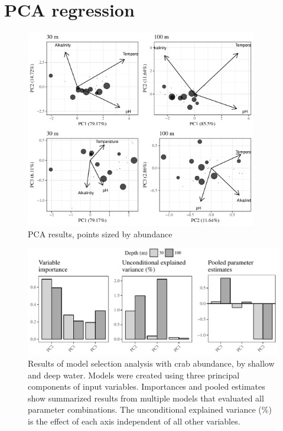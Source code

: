 \documentclass[letterpaper,12pt]{article}\usepackage[]{graphicx}\usepackage[]{color}
\makeatletter
\def\maxwidth{ %
  \ifdim\Gin@nat@width>\linewidth
    \linewidth
  \else
    \Gin@nat@width
  \fi
}
\newenvironment{knitrout}{}{} %
\makeatother
\begin{document}
\section{PCA regression}

\begin{knitrout}
\color{fgcolor}\begin{figure}[!h]
\includegraphics[width=0.9\textwidth]{figure/unnamed-chunk-8-1} \caption[PCA results, points sized by abundance]{PCA results, points sized by abundance}\label{fig:unnamed-chunk-8}
\end{figure}


\end{knitrout}



\begin{knitrout}
\color{fgcolor}\begin{figure}
\includegraphics[width=\maxwidth]{figure/unnamed-chunk-10-1} \caption[Results of model selection analysis with crab abundance, by shallow and deep water]{Results of model selection analysis with crab abundance, by shallow and deep water. Models were created using three principal components of input variables. Importances and pooled estimates show summarized results from multiple models that evaluated all parameter combinations.  The unconditional explained variance (\%) is the effect of each axis independent of all other variables.}\label{fig:unnamed-chunk-10}
\end{figure}


\end{knitrout}
\end{document}
